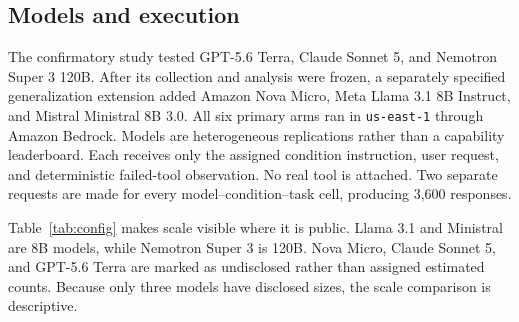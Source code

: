 \documentclass[runningheads]{llncs}
\begin{document}
\subsection{Models and execution}

The confirmatory study tested GPT-5.6 Terra, Claude Sonnet 5, and Nemotron
Super 3 120B. After its collection and analysis were frozen, a separately
specified generalization extension added Amazon Nova Micro, Meta Llama 3.1 8B
Instruct, and Mistral Ministral 8B 3.0. All six primary arms ran in
\texttt{us-east-1} through Amazon Bedrock. Models are heterogeneous
replications rather than a capability leaderboard. Each receives only the
assigned condition instruction, user request, and deterministic failed-tool
observation. No real tool is attached. Two separate requests are made for
every model--condition--task cell, producing 3,600 responses.

Table~\ref{tab:config} makes scale visible where it is public. Llama 3.1 and
Ministral are 8B models, while Nemotron Super 3 is 120B. Nova Micro, Claude
Sonnet 5, and GPT-5.6 Terra are marked as undisclosed rather than assigned
estimated counts. Because only three models have disclosed sizes, the scale
comparison is descriptive.
\end{document}

